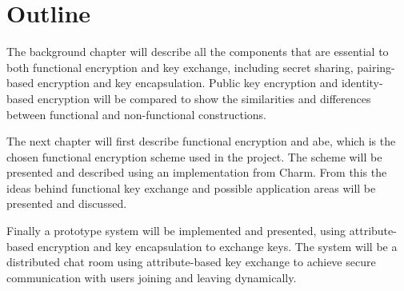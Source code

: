 \section{Outline}\label{sec:outline}
The background chapter will describe all the components that are essential to both functional encryption and key exchange, including secret sharing, pairing-based encryption and key encapsulation. Public key encryption and identity-based encryption will be compared to show the similarities and differences between functional and non-functional constructions. 
\par The next chapter will first describe functional encryption and \gls{abe}, which is the chosen functional encryption scheme used in the project. The scheme will be presented and described using an implementation from Charm. From this the ideas behind functional key exchange and possible application areas will be presented and discussed.
\par Finally a prototype system will be implemented and presented, using attribute-based encryption and key encapsulation to exchange keys. The system will be a distributed chat room using attribute-based key exchange to achieve secure communication with users joining and leaving dynamically.

